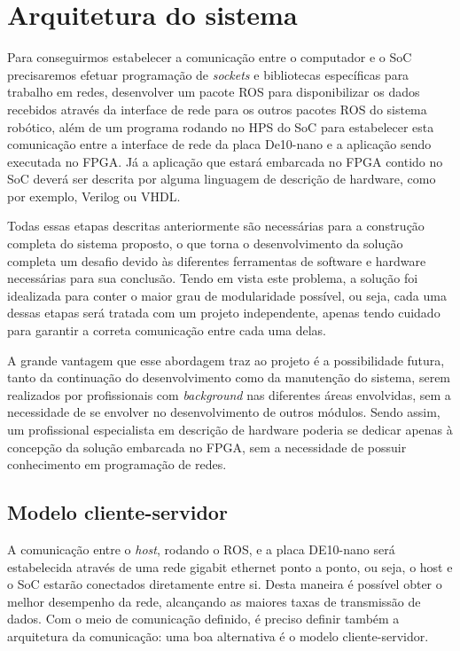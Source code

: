 \chapter{Arquitetura do sistema}\label{cap:arquitetura}

Para conseguirmos estabelecer a comunicação entre o computador e o SoC precisaremos efetuar programação de \textit{sockets} e bibliotecas específicas para trabalho em redes, desenvolver um pacote ROS para disponibilizar os dados recebidos através da interface de rede para os outros pacotes ROS do sistema robótico, além de um programa rodando no HPS do SoC para estabelecer esta comunicação entre a interface de rede da placa De10-nano e a aplicação sendo executada no FPGA\@. Já a aplicação que estará embarcada no FPGA contido no SoC deverá ser descrita por alguma linguagem de descrição de hardware, como por exemplo, Verilog ou VHDL\@.

Todas essas etapas descritas anteriormente são necessárias para a construção completa do sistema proposto, o que torna o desenvolvimento da solução completa um desafio devido às diferentes ferramentas de software e hardware necessárias para sua conclusão. Tendo em vista este problema, a solução foi idealizada para conter o maior grau de modularidade possível, ou seja, cada uma dessas etapas será tratada com um projeto independente, apenas tendo cuidado para garantir a correta comunicação entre cada uma delas.

A grande vantagem que esse abordagem traz ao projeto é a possibilidade futura, tanto da continuação do desenvolvimento como da manutenção do sistema, serem realizados por profissionais com \textit{background} nas diferentes áreas envolvidas, sem a necessidade de se envolver no desenvolvimento de outros módulos. Sendo assim, um profissional especialista em descrição de hardware poderia se dedicar apenas à concepção da solução embarcada no FPGA, sem a necessidade de possuir conhecimento em programação de redes. 

\section{Modelo cliente-servidor}
A comunicação entre o \textit{host}, rodando o ROS, e a placa DE10-nano será estabelecida através de uma rede gigabit ethernet ponto a ponto, ou seja, o host e o SoC estarão conectados diretamente entre si. Desta maneira é possível obter o melhor desempenho da rede, alcançando as maiores taxas de transmissão de dados. Com o meio de comunicação definido, é preciso definir também a arquitetura da comunicação: uma boa alternativa é o modelo cliente-servidor.

